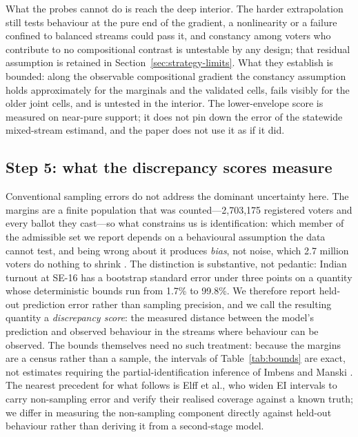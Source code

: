 \documentclass[11pt]{article}
\begin{document}
What the probes cannot do is reach the deep interior. The harder extrapolation still tests behaviour at the pure end of the gradient, a nonlinearity or a failure confined to balanced streams could pass it, and constancy among voters who contribute to no compositional contrast is untestable by any design; that residual assumption is retained in Section~\ref{sec:strategy-limits}. What they establish is bounded: along the observable compositional gradient the constancy assumption holds approximately for the marginals and the validated cells, fails visibly for the older joint cells, and is untested in the interior. The lower-envelope score is measured on near-pure support; it does not pin down the error of the statewide mixed-stream estimand, and the paper does not use it as if it did.

\subsection{Step 5: what the discrepancy scores measure}
\label{sec:strategy-errors}

Conventional sampling errors do not address the dominant uncertainty here. The margins are a finite population that was counted---2,703,175 registered voters and every ballot they cast---so what constrains us is identification: which member of the admissible set we report depends on a behavioural assumption the data cannot test, and being wrong about it produces \emph{bias}, not noise, which 2.7 million voters do nothing to shrink \cite{manski1995}. The distinction is substantive, not pedantic: Indian turnout at SE-16 has a bootstrap standard error under three points on a quantity whose deterministic bounds run from 1.7\% to 99.8\%. We therefore report held-out prediction error rather than sampling precision, and we call the resulting quantity a \emph{discrepancy score}: the measured distance between the model's prediction and observed behaviour in the streams where behaviour can be observed. The bounds themselves need no such treatment: because the margins are a census rather than a sample, the intervals of Table~\ref{tab:bounds} are exact, not estimates requiring the partial-identification inference of Imbens and Manski \cite{imbensmanski2004}. The nearest precedent for what follows is Elff et al.\cite{elff2008}, who widen EI intervals to carry non-sampling error and verify their realised coverage against a known truth; we differ in measuring the non-sampling component directly against held-out behaviour rather than deriving it from a second-stage model.
\end{document}

